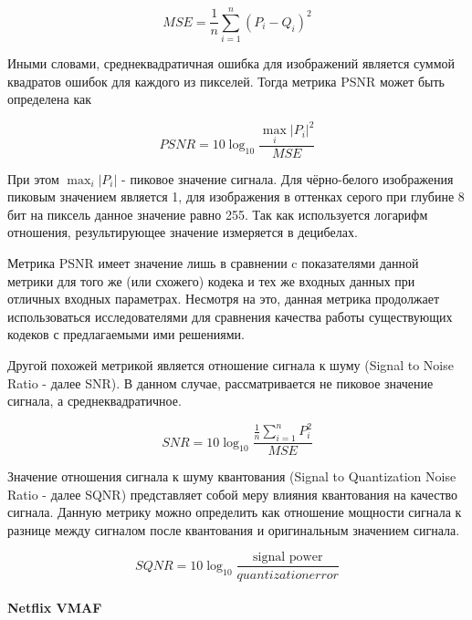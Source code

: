 \begin{equation} \label{eq:img_mse}
    MSE = \frac{1}{n} \sum_{i=1}^{n}\left(P_{i} - Q_{i}\right)^2
\end{equation}

Иными словами, среднеквадратичная ошибка для изображений является суммой
квадратов ошибок для каждого из пикселей. Тогда метрика PSNR может быть
определена как

\begin{equation} \label{eq:img_psnr}
    PSNR = 10\log_{10} \frac{\max_{i}\left|P_{i}\right|^{2}}{MSE}
\end{equation}

При этом $\max_{i}\left|P_{i}\right|$ - пиковое значение сигнала. Для
чёрно-белого изображения пиковым значением является 1, для изображения в
оттенках серого при глубине 8 бит на пиксель данное значение равно 255. Так как
используется логарифм отношения, результирующее значение измеряется в децибелах.

Метрика PSNR имеет значение лишь в сравнении c показателями данной метрики для
того же (или схожего) кодека и тех же входных данных при отличных входных
параметрах\cite{HuynhThu2008}. Несмотря на это, данная метрика продолжает
использоваться исследователями для сравнения качества работы существующих
кодеков с предлагаемыми ими решениями\cite{NetflixVMAFMedium}.

Другой похожей метрикой является отношение сигнала к шуму (Signal to Noise Ratio
- далее SNR). В данном случае, рассматривается не пиковое значение сигнала, а
среднеквадратичное.

\begin{equation} \label{eq:img_snr}
    SNR = 10\log_{10} \frac{\frac{1}{n}\sum_{i=1}^{n} P_{i}^{2}}{MSE}
\end{equation}

Значение отношения сигнала к шуму квантования (Signal to Quantization Noise
Ratio - далее SQNR) представляет собой меру влияния квантования на качество
сигнала. Данную метрику можно определить как отношение мощности сигнала к
разнице между сигналом после квантования и оригинальным значением сигнала.

\begin{equation} \label{eq:img_sqnr}
    SQNR = 10\log_{10} \frac{\text{signal power}}{quantization error}
\end{equation}

\paragraph{Netflix VMAF}

